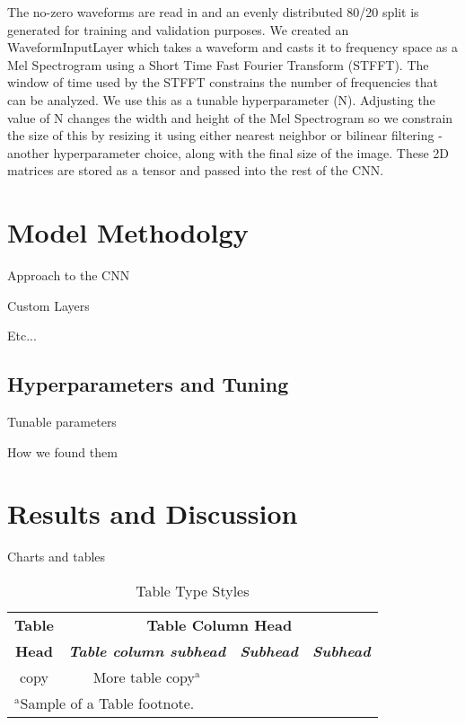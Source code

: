 \documentclass[conference]{IEEEtran}
\begin{document}
The no-zero waveforms are read in and an evenly distributed 80/20 split is generated
for training and validation purposes. We created an WaveformInputLayer which
takes a waveform and casts it to frequency space as a Mel Spectrogram using a
Short Time Fast Fourier Transform (STFFT). The window of time used by the STFFT
constrains the number of frequencies that can be analyzed. We use this as a tunable
hyperparameter (N). Adjusting the value of N changes the width and height of the Mel
Spectrogram so we constrain the size of this by resizing it using either nearest
neighbor or bilinear filtering - another hyperparameter choice, along with the
final size of the image. These 2D matrices are stored as a tensor and passed into
the rest of the CNN.


\section{Model Methodolgy}

Approach to the CNN

Custom Layers

Etc...

\subsection{Hyperparameters and Tuning}\label{AA}

Tunable parameters

How we found them

\section{Results and Discussion}

Charts and tables

\begin{table}[htbp]
\caption{Table Type Styles}
\begin{center}
\begin{tabular}{|c|c|c|c|}
\hline
\textbf{Table}&\multicolumn{3}{|c|}{\textbf{Table Column Head}} \\
\cline{2-4} 
\textbf{Head} & \textbf{\textit{Table column subhead}}& \textbf{\textit{Subhead}}& \textbf{\textit{Subhead}} \\
\hline
copy& More table copy$^{\mathrm{a}}$& &  \\
\hline
\multicolumn{4}{l}{$^{\mathrm{a}}$Sample of a Table footnote.}
\end{tabular}
\label{tab1}
\end{center}
\end{table}
\end{document}
